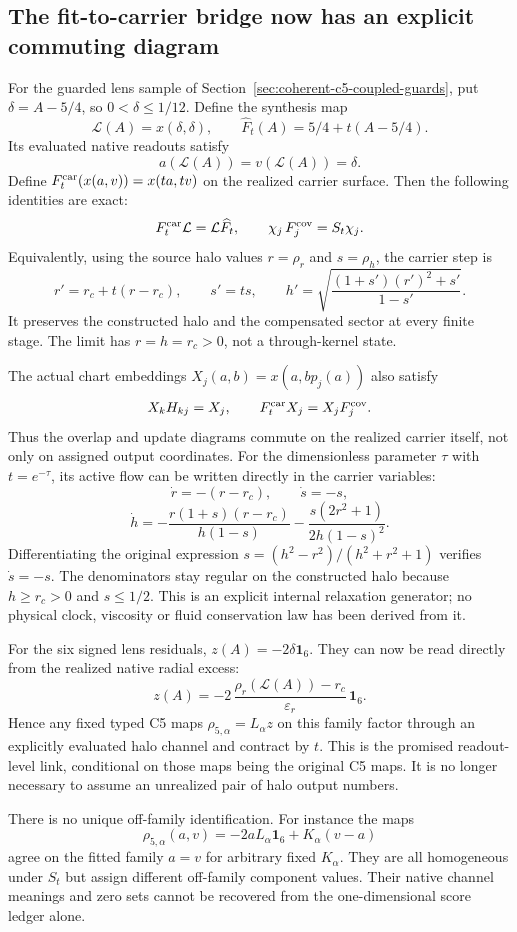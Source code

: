 \documentclass[11pt,a4paper]{article}
\begin{document}
\subsection{The fit-to-carrier bridge now has an explicit commuting diagram}
For the guarded lens sample of Section~\ref{sec:coherent-c5-coupled-guards},
put $\delta=A-5/4$, so $0<\delta\le1/12$. Define the synthesis map
\[
 \mathcal L(A)=x(\delta,\delta),\qquad
 \widehat F_t(A)=5/4+t(A-5/4).
\]
Its evaluated native readouts satisfy
\[
 a(\mathcal L(A))=v(\mathcal L(A))=\delta.
\]
Define $F_t^{\rm car}(x(a,v))=x(ta,tv)$ on the realized carrier surface.
Then the following identities are exact:
\[
 F_t^{\rm car}\mathcal L=\mathcal L\widehat F_t,\qquad
 \chi_j\,F_j^{\rm cov}=S_t\chi_j.
\]
Equivalently, using the source halo values $r=\rho_r$ and $s=\rho_h$,
the carrier step is
\[
 r'=r_c+t(r-r_c),\qquad s'=ts,\qquad
 h'=\sqrt{\frac{(1+s')(r')^2+s'}{1-s'}}.
\]
It preserves the constructed halo and the compensated sector at every
finite stage. The limit has $r=h=r_c>0$, not a through-kernel state.

The actual chart embeddings $X_j(a,b)=x(a,bp_j(a))$ also satisfy
\[
 X_k H_{kj}=X_j,\qquad
 F_t^{\rm car}X_j=X_jF_j^{\rm cov}.
\]
Thus the overlap and update diagrams commute on the realized carrier
itself, not only on assigned output coordinates.
For the dimensionless parameter $\tau$ with $t=e^{-\tau}$, its active
flow can be written directly in the carrier variables:
\[
 \dot r=-(r-r_c),\qquad \dot s=-s,
\]
\[
 \dot h=-\frac{r(1+s)(r-r_c)}{h(1-s)}
         -\frac{s(2r^2+1)}{2h(1-s)^2}.
\]
Differentiating the original expression
$s=(h^2-r^2)/(h^2+r^2+1)$ verifies $\dot s=-s$.
The denominators stay regular on the constructed halo because
$h\ge r_c>0$ and $s\le1/2$. This is an explicit internal relaxation
generator; no physical clock, viscosity or fluid conservation law has
been derived from it.

For the six signed lens residuals,
$z(A)=-2\delta\mathbf1_6$. They can now be read directly from the
realized native radial excess:
\[
 z(A)=-2\,\frac{\rho_r(\mathcal L(A))-r_c}{\varepsilon_r}\,
 \mathbf1_6.
\]
Hence any fixed typed C5 maps $\rho_{5,\alpha}=L_\alpha z$ on this
family factor through an explicitly evaluated halo channel and contract
by $t$. This is the promised readout-level link, conditional on those
maps being the original C5 maps. It is no longer necessary to assume an
unrealized pair of halo output numbers.

There is no unique off-family identification. For instance the maps
\[
 \rho_{5,\alpha}(a,v)
 =-2aL_\alpha\mathbf1_6+K_\alpha(v-a)
\]
agree on the fitted family $a=v$ for arbitrary fixed $K_\alpha$.
They are all homogeneous under $S_t$ but assign different off-family
component values. Their native channel meanings and zero sets cannot
be recovered from the one-dimensional score ledger alone.
\end{document}
